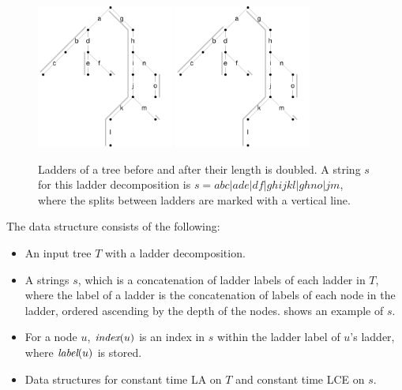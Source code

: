 \documentclass[a4]{article}
\newcommand*{\pref}{\prettyref}
\begin{document}
\begin{figure}[tp]
    \begin{center}
        \includegraphics[width=0.4\textwidth,page=1]{ladder.pdf}
        \includegraphics[width=0.4\textwidth,page=2]{ladder.pdf}
    \end{center}
    \caption{\label{fig:ladder-ds} Ladders of a tree before and after their length is doubled. A  string $s$ for this ladder decomposition is $s=abc|ade|df|ghijkl|ghno|jm$, where the splits between ladders are marked with a vertical line.}
\end{figure}

The  data structure consists of the following:
\begin{itemize}
\item An input tree $T$ with a ladder decomposition.
\item A strings $s$, which is a concatenation of ladder labels of each ladder in $T$, where the label of a ladder is the concatenation of labels of each node in the ladder, ordered ascending by the depth of the nodes. \pref{fig:ladder-ds} shows an example of $s$.
\item For a node $u$, $\textit{index}(u)$ is an index in $s$ within the ladder label of $u$'s ladder, where $\textit{label}(u)$ is stored.
\item Data structures for constant time LA on $T$ and constant time LCE on $s$.
\end{itemize}
\end{document}

